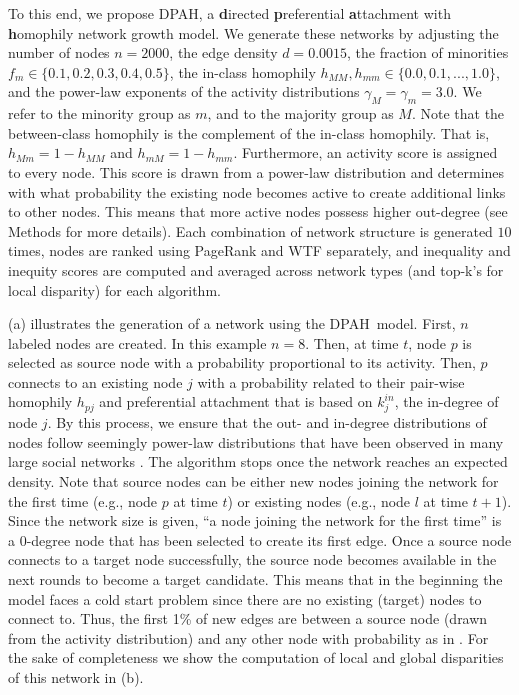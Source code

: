 \documentclass[fleqn,10pt]{wlscirep}
\begin{document}
To this end, we propose {DPAH}, a \textbf{d}irected \textbf{p}referential \textbf{a}ttachment with \textbf{h}omophily network growth model. We generate these networks by adjusting the number of nodes $n=2000$, the edge density $d=0.0015$, the fraction of minorities $f_m \in \{0.1, 0.2, 0.3, 0.4, 0.5\}$, the in-class homophily $h_{MM}, h_{mm} \in \{0.0, 0.1, ..., 1.0\}$, and the power-law exponents of the activity distributions $\gamma_M = \gamma_m = 3.0$. We refer to the minority group as $m$, and to the majority group as $M$. Note that the between-class homophily is the complement of the in-class homophily. That is, $h_{Mm}=1-h_{MM}$ and $h_{mM}=1-h_{mm}$.
Furthermore, an activity score is assigned to every node. This score is drawn from a power-law distribution and determines with what probability the existing node becomes active to create additional links to other nodes. This means that more active nodes possess higher out-degree (see Methods for more details).
Each combination of network structure is generated $10$ times, nodes are ranked using PageRank and WTF separately, and inequality and inequity scores are computed and averaged across network types (and top-k's for local disparity) for each algorithm.






 (a) illustrates the generation of a network using the {DPAH}~model. First, $n$ labeled nodes are created. In this example $n=8$. Then, at time $t$, node $p$ is selected as source node with a probability proportional to its activity. Then, $p$ connects to an existing node $j$ with a probability related to their pair-wise homophily $h_{pj}$ and preferential attachment that is based on $k^{in}_{j}$, the in-degree of node $j$. By this process, we ensure that the out- and in-degree distributions of nodes follow seemingly power-law distributions that have been observed in many large social networks \cite{voitalov2019scale}. The algorithm stops once the network reaches an expected density. %
Note that source nodes can be either new nodes joining the network for the first time (e.g., node $p$ at time $t$) or existing nodes (e.g., node $l$ at time $t+1$). Since the network size is given, ``a node joining the network for the first time'' is a 0-degree node that has been selected to create its first edge. Once a source node connects to a target node successfully, the source node becomes available in the next rounds to become a target candidate. This means that in the beginning the model faces a cold start problem since there are no existing (target) nodes to connect to. Thus, the first 1\% of new edges are between a source node (drawn from the activity distribution) and any other node with probability as in . For the sake of completeness we show the computation of local and global disparities of this network in  (b). 
%
\end{document}
